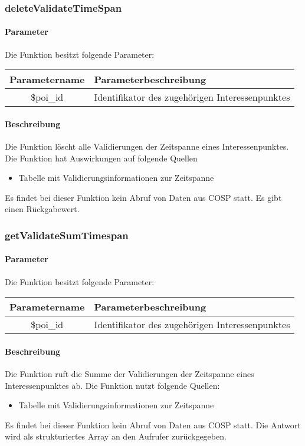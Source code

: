 \subsubsection{deleteValidateTimeSpan}
\paragraph{Parameter} Die Funktion besitzt folgende Parameter:
\begin{table}[H]
	\begin{tabular}{|c|p{11cm}|}
		\hline
		\textbf{Parametername} & \textbf{Parameterbeschreibung} \\ \hline
		\$poi\_id & Identifikator des zugehörigen Interessenpunktes \\ \hline
	\end{tabular}
\end{table}
\paragraph{Beschreibung} Die Funktion löscht alle Validierungen der Zeitspanne eines Interessenpunktes. Die Funktion hat Auswirkungen auf folgende Quellen
\begin{itemize}
	\item Tabelle mit Validierungsinformationen zur Zeitspanne
\end{itemize}
Es findet bei dieser Funktion kein Abruf von Daten aus {\glqq COSP\grqq} statt. Es gibt einen Rückgabewert.
\subsubsection{getValidateSumTimespan}
\paragraph{Parameter} Die Funktion besitzt folgende Parameter:
\begin{table}[H]
	\begin{tabular}{|c|p{11cm}|}
		\hline
		\textbf{Parametername} & \textbf{Parameterbeschreibung} \\ \hline
		\$poi\_id & Identifikator des zugehörigen Interessenpunktes \\ \hline
	\end{tabular}
\end{table}
\paragraph{Beschreibung} Die Funktion ruft die Summe der Validierungen der Zeitspanne eines Interessenpunktes ab. Die Funktion nutzt folgende Quellen:
\begin{itemize}
	\item Tabelle mit Validierungsinformationen zur Zeitspanne
\end{itemize}
Es findet bei dieser Funktion kein Abruf von Daten aus {\glqq COSP\grqq} statt. Die Antwort wird als strukturiertes Array an den Aufrufer zurückgegeben.
